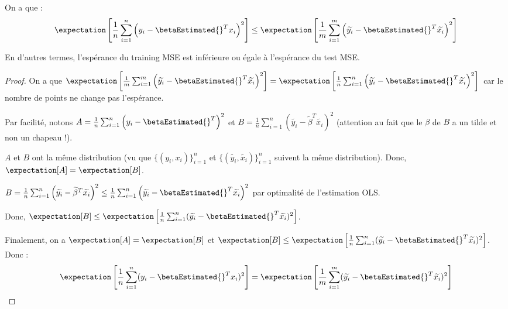         \begin{theorem}
            On a que :
                \[
                    \expectation\left[\frac{1}{n}\sum_{i=1}^n \left(y_i - \betaEstimated{}^T x_i\right)^2\right] \leq \expectation\left[\frac{1}{m} \sum_{i=1}^m \left(\widetilde{y_i} - \betaEstimated{}^T \widetilde{x_i}\right)^2\right]
                \]

            En d'autres termes, l'espérance du training MSE est inférieure ou égale à l'espérance du test MSE.
        \end{theorem}
        \begin{proof}
            On a que \(\expectation\left[\frac{1}{m} \sum_{i=1}^m \left(\widetilde{y_i} - \betaEstimated{}^T \widetilde{x_i}\right)^2\right] = \expectation\left[\frac{1}{n} \sum_{i=1}^n \left(\widetilde{y_i} - \betaEstimated{}^T \widetilde{x_i}\right)^2\right]\) car le nombre de points ne change pas l'espérance.

            Par facilité, notons \(A = \frac{1}{n}\sum_{i=1}^n \left(y_i - \betaEstimated{}^T\right)^2\) et \(B = \frac{1}{n} \sum_{i=1}^n \left(\widetilde{y_i} - \widetilde{\beta}^T \widetilde{x_i}\right)^2\) (attention au fait que le \(\beta\) de \(B\) a un tilde et non un chapeau !).

            \(A\) et \(B\) ont la même distribution (vu que \(\{(y_i, x_i)\}_{i=1}^n\) et \(\{(\widetilde{y_i}, \widetilde{x_i})\}_{i=1}^n\) suivent la même distribution). Donc, \(\expectation[A] = \expectation[B]\).

            \(B = \frac{1}{n}\sum_{i=1}^n \left(\widetilde{y_i} - \widetilde{\beta}^T \widetilde{x_i}\right)^2 \leq \frac{1}{n} \sum_{i=1}^n \left(\widetilde{y_i} - \betaEstimated{}^T \widetilde{x_i}\right)^2\) par optimalité de l'estimation OLS.

            Donc, \(\expectation[B] \leq \expectation\left[\frac{1}{n} \sum_{i=1}^n (\widetilde{y_i} - \betaEstimated{}^T \widetilde{x_i})^2\right]\).

            Finalement, on a \(\expectation[A] = \expectation[B]\) et \(\expectation[B] \leq \expectation\left[\frac{1}{n} \sum_{i=1}^n (\widetilde{y_i} - \betaEstimated{}^T \widetilde{x_i})^2\right]\). Donc :
            \[
                \expectation\left[\frac{1}{n} \sum_{i=1}^n (y_i - \betaEstimated{}^T x_i)^2\right] = \expectation\left[\frac{1}{m} \sum_{i=1}^m (\widetilde{y_i} - \betaEstimated{}^T \widetilde{x_i})^2\right]
            \]
        \end{proof}

